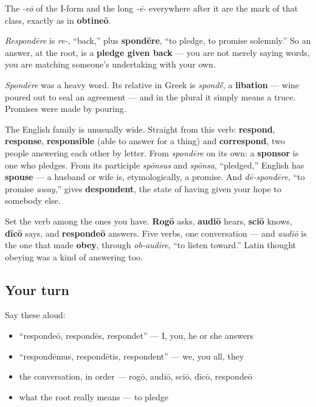 The \emph{-eō} of the I-form and the long \emph{-ē-} everywhere after it are the mark of that class, exactly as in \textbf{obtineō}.

\begin{cousinweb}
\emph{Respondēre} is \emph{re-}, \textquotedblleft{}back,\textquotedblright{} plus \textbf{spondēre}, \textquotedblleft{}to pledge, to promise solemnly.\textquotedblright{} So an answer, at the root, is a \textbf{pledge given back} — you are not merely saying words, you are matching someone's undertaking with your own.

\emph{Spondēre} was a heavy word. Its relative in Greek is \emph{spond\'{\={e}}}, a \textbf{libation} — wine poured out to seal an agreement — and in the plural it simply means a truce. Promises were made by pouring.

The English family is unusually wide. Straight from this verb: \textbf{respond}, \textbf{response}, \textbf{responsible} (able to answer for a thing) and \textbf{correspond}, two people answering each other by letter. From \emph{spondēre} on its own: a \textbf{sponsor} is one who pledges. From its participle \emph{spōnsus} and \emph{spōnsa}, \textquotedblleft{}pledged,\textquotedblright{} English has \textbf{spouse} — a husband or wife is, etymologically, a promise. And \emph{dē-spondēre}, \textquotedblleft{}to promise \emph{away},\textquotedblright{} gives \textbf{despondent}, the state of having given your hope to somebody else.

Set the verb among the ones you have. \textbf{Rogō} asks, \textbf{audiō} hears, \textbf{sciō} knows, \textbf{dīcō} says, and \textbf{respondeō} answers. Five verbs, one conversation — and \emph{audiō} is the one that made \textbf{obey}, through \emph{ob-audīre}, \textquotedblleft{}to listen toward.\textquotedblright{} Latin thought obeying was a kind of answering too.
\end{cousinweb}

\subsection*{Your turn}
Say these aloud:

\begin{itemize}
\raggedright
  \item \textquotedblleft{}respondeō, respondēs, respondet\textquotedblright{} — I, you, he or she answers
  \item \textquotedblleft{}respondēmus, respondētis, respondent\textquotedblright{} — we, you all, they
  \item the conversation, in order — rogō, audiō, sciō, dīcō, respondeō
  \item what the root really means — to pledge
\end{itemize}

